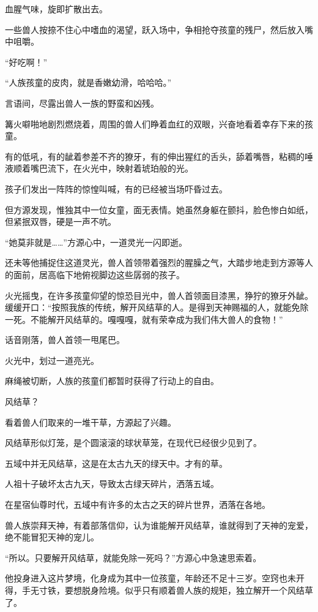 \begin{this_body}
血腥气味，旋即扩散出去。

一些兽人按捺不住心中嗜血的渴望，跃入场中，争相抢夺孩童的残尸，然后放入嘴中咀嚼。

“好吃啊！”

“人族孩童的皮肉，就是香嫩幼滑，哈哈哈。”

言语间，尽露出兽人一族的野蛮和凶残。

篝火噼啪地剧烈燃烧着，周围的兽人们睁着血红的双眼，兴奋地看着幸存下来的孩童。

有的低吼，有的龇着参差不齐的獠牙，有的伸出猩红的舌头，舔着嘴唇，粘稠的唾液顺着嘴巴流下，在火光中，映射着琥珀般的光。

孩子们发出一阵阵的惊惶叫喊，有的已经被当场吓昏过去。

但方源发现，惟独其中一位女童，面无表情。她虽然身躯在颤抖，脸色惨白如纸，但紧抿双唇，硬是一声不吭。

“她莫非就是……”方源心中，一道灵光一闪即逝。

还未等他捕捉住这道灵光，兽人首领带着强烈的腥臊之气，大踏步地走到方源等人的面前，居高临下地俯视脚边这些孱弱的孩子。

火光摇曳，在许多孩童仰望的惊恐目光中，兽人首领面目漆黑，狰狞的獠牙外龇。缓缓开口：“按照我族的传统，解开风结草的人。是得到天神赐福的人，就能免除一死。不能解开风结草的。嘎嘎嘎，就有荣幸成为我们伟大兽人的食物！”

话音刚落，兽人首领一甩尾巴。

火光中，划过一道亮光。

麻绳被切断，人族的孩童们都暂时获得了行动上的自由。

风结草？

看着兽人们取来的一堆干草，方源起了兴趣。

风结草形似灯笼，是个圆滚滚的球状草笼，在现代已经很少见到了。

五域中并无风结草，这是在太古九天的绿天中。才有的草。

人祖十子破坏太古九天，导致太古绿天碎片，洒落五域。

在星宿仙尊时代，五域中有许多的太古之天的碎片世界，洒落在各地。

兽人族崇拜天神，有着部落信仰，认为谁能解开风结草，谁就得到了天神的宠爱，绝不能冒犯天神的宠儿。

“所以。只要解开风结草，就能免除一死吗？”方源心中急速思索着。

他投身进入这片梦境，化身成为其中一位孩童，年龄还不足十三岁。空窍也未开得，手无寸铁，要想脱身险境。似乎只有顺着兽人族的规矩，独立解开一个风结草了。


\end{this_body}
